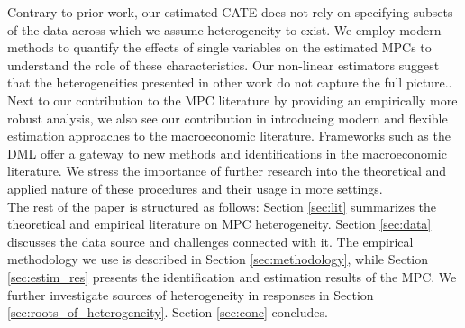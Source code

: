 Contrary to prior work, our estimated CATE does not rely on specifying subsets of the data across which we assume heterogeneity to exist. We employ modern methods to quantify the effects of single variables on the estimated MPCs to understand the role of these characteristics. Our non-linear estimators suggest that the heterogeneities presented in other work do not capture the full picture.. Next to our contribution to the MPC literature by providing an empirically more robust analysis, we also see our contribution in introducing modern and flexible estimation approaches to the macroeconomic literature. Frameworks such as the DML offer a gateway to new methods and identifications in the macroeconomic literature. We stress the importance of further research into the theoretical and applied nature of these procedures and their usage in more settings. \\
The rest of the paper is structured as follows: Section \ref{sec:lit} summarizes the theoretical and empirical literature on MPC heterogeneity. Section \ref{sec:data} discusses the data source and challenges connected with it. The empirical methodology we use is described in Section \ref{sec:methodology}, while Section \ref{sec:estim_res} presents the identification and estimation results of the MPC. We further investigate sources of heterogeneity in responses in Section \ref{sec:roots_of_heterogeneity}. Section \ref{sec:conc} concludes.